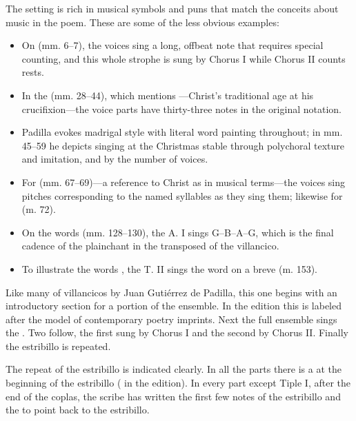 The setting is rich in musical symbols and puns that match the conceits about
music in the poem.%
    \Autocite[167--178]{Cashner:PhD}
These are some of the less obvious examples:
\begin{itemize}
    \item On  (mm. 6--7), the voices sing a long, offbeat note that
        requires special counting, and this whole strophe is sung by Chorus I
        while Chorus II counts rests.
    \item In the  (mm. 28--44), which mentions ---Christ's traditional age at his crucifixion---the voice
        parts have thirty-three notes in the original notation.
    \item Padilla evokes madrigal style with literal word painting throughout; 
        in mm. 45--59 he depicts singing at the Christmas stable  through polychoral texture and imitation, and
         by the number of voices.
    \item For  (mm. 67--69)---a
        reference to Christ as  in musical
        terms---the voices sing pitches corresponding to the named syllables as
        they sing them; likewise for  (m. 72).
    \item On the words  (mm. 128--130), the A. I sings
        G--B\fl--A--G, which is the final cadence of the plainchant  in the transposed  of the villancico.
    \item To illustrate the words , the
        T. II sings the word  on a breve (m. 153).
\end{itemize}


Like many of villancicos by Juan Gutiérrez de Padilla, this one begins with an
introductory section for a portion of the ensemble.
In the edition this is labeled  after the model of 
contemporary poetry imprints.
Next the full ensemble sings the .
Two  follow, the first sung by Chorus I and the second by 
Chorus II. 
Finally the estribillo is repeated.

The repeat of the estribillo is indicated clearly.
In all the parts there is a  at the beginning of the 
estribillo ( in the edition).
In every part except Tiple I, after the end of the coplas, the scribe has 
written the first few notes of the estribillo and the  to point 
back to the estribillo.


